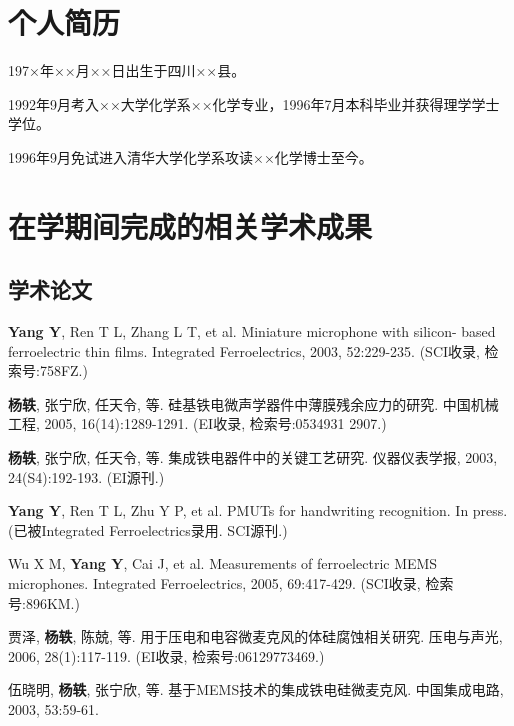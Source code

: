 
\begin{resume}

  \section*{个人简历}

197×年××月××日出生于四川××县。

1992年9月考入××大学化学系××化学专业，1996年7月本科毕业并获得理学学士学位。

1996年9月免试进入清华大学化学系攻读××化学博士至今。

  \section*{在学期间完成的相关学术成果}

  \subsection*{学术论文}

  \begin{achievements}
    \item \textbf{Yang Y}, Ren T L, Zhang L T, et al. Miniature microphone with silicon- based ferroelectric thin films. Integrated Ferroelectrics, 2003, 52:229-235. (SCI收录, 检索号:758FZ.)
    \item \textbf{杨轶}, 张宁欣, 任天令, 等. 硅基铁电微声学器件中薄膜残余应力的研究. 中国机械工程, 2005, 16(14):1289-1291. (EI收录, 检索号:0534931 2907.)
    \item \textbf{杨轶}, 张宁欣, 任天令, 等. 集成铁电器件中的关键工艺研究. 仪器仪表学报, 2003, 24(S4):192-193. (EI源刊.)
    \item \textbf{Yang Y}, Ren T L, Zhu Y P, et al. PMUTs for handwriting recognition. In press. (已被Integrated Ferroelectrics录用. SCI源刊.)
    \item Wu X M, \textbf{Yang Y}, Cai J, et al. Measurements of ferroelectric MEMS microphones. Integrated Ferroelectrics, 2005, 69:417-429. (SCI收录, 检索号:896KM.)
    \item 贾泽, \textbf{杨轶}, 陈兢, 等. 用于压电和电容微麦克风的体硅腐蚀相关研究. 压电与声光, 2006, 28(1):117-119. (EI收录, 检索号:06129773469.)
    \item 伍晓明, \textbf{杨轶}, 张宁欣, 等. 基于MEMS技术的集成铁电硅微麦克风. 中国集成电路, 2003, 53:59-61.
  \end{achievements}



\end{resume}
